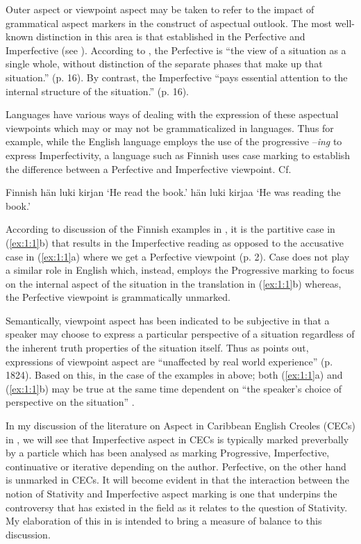 Outer aspect or viewpoint aspect may be taken to refer to the impact of
grammatical aspect markers in the construct of aspectual outlook.  The most
well-known distinction in this area is that established in the Perfective and
Imperfective (see \citealt{Comrie1976}).  According to \citet{Comrie1976}, the
Perfective is ``the view of a situation as a single whole, without distinction of
the separate phases that make up that situation.'' (p. 16).  By contrast, the
Imperfective ``pays essential attention to the internal structure of the
situation.'' (p. 16).

Languages have various ways of dealing with the expression of these aspectual
viewpoints which may or may not be grammaticalized in languages.  Thus for
example, while the English language employs the use of the progressive
–\textit{ing} to express Imperfectivity, a language such as Finnish uses case
marking to establish the difference between a Perfective and Imperfective
viewpoint.  
Cf. 

\ea\label{ex:1:1} Finnish \citep[8]{Comrie1976}
  \ea hän luki kirjan
  \glt `He read the book.'
  \ex hän luki kirjaa
  \glt `He was reading the book.'
  \z
\z

According to \citet{Travis2010} discussion of the Finnish examples in
, it is the partitive case in (\ref{ex:1:1}b) that results in the
Imperfective reading as opposed to the accusative case in (\ref{ex:1:1}a) where
we get a Perfective viewpoint (p. 2).  Case does not play a similar role in
English which, instead, employs the Progressive marking to focus on the internal
aspect of the situation in the translation in (\ref{ex:1:1}b) whereas, the Perfective
viewpoint is grammatically unmarked.

Semantically, viewpoint aspect has been indicated to be subjective in that a
speaker may choose to express a particular perspective of a situation regardless
of the inherent truth properties of the situation itself. Thus as
\citet{Guéron2008} points out, expressions of viewpoint aspect are ``unaffected
by real world experience'' (p. 1824). Based on this, in the case of the
examples in  above; both (\ref{ex:1:1}a) and (\ref{ex:1:1}b) may be
true at the same time dependent on ``the speaker's choice of perspective on the
situation'' \citep[479]{Smith1983}.

In my discussion of the literature on Aspect in Caribbean English
Creoles (CECs) in , we will see that Imperfective aspect in CECs
is typically marked preverbally by a particle which has been analysed as marking
Progressive, Imperfective, continuative or iterative depending on the author.
Perfective, on the other hand is unmarked in CECs. It will become evident in
 that the interaction between the notion of Stativity and
Imperfective aspect marking is one that underpins the controversy that has
existed in the field as it relates to the question of Stativity. My elaboration
of this in  is intended to bring a measure of balance to this
discussion.

